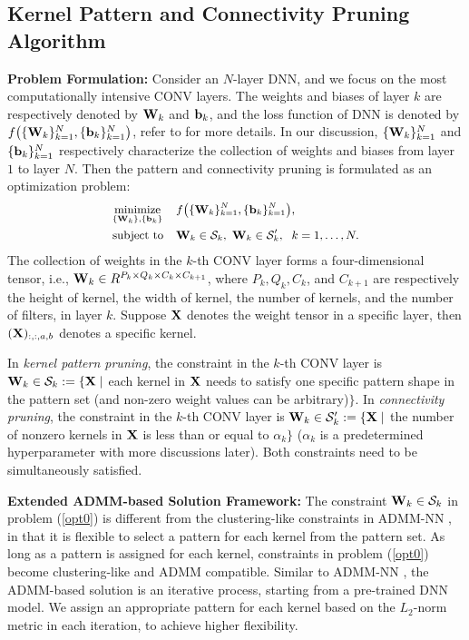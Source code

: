 \documentclass[sigplan,screen]{acmart}
\begin{document}
\subsection{Kernel Pattern and Connectivity Pruning Algorithm}

\textbf{Problem Formulation:} Consider an $N$-layer DNN, and we focus on the most computationally intensive CONV layers. The weights and biases of layer $k$ are respectively denoted by ${\bf{W}}_{k}$ and ${\bf{b}}_{k}$, and the loss function of DNN is denoted by $f \big( \{{\bf{W}}_{k}\}_{k=1}^N, \{{\bf{b}}_{k} \}_{k=1}^N \big)$, refer to \cite{zhang2018systematic}
for more details. In our 
discussion, $\{{\bf{W}}_{k}\}_{k=1}^N$ and $\{{\bf{b}}_{k} \}_{k=1}^N$ respectively characterize the collection of weights and biases from layer $1$ to layer $N$. Then the pattern and connectivity pruning is formulated as an optimization problem:
\begin{equation}
\label{opt0}\small
\begin{aligned}
& \underset{ \{{\bf{W}}_{k}\},\{{\bf{b}}_{k} \}}{\text{minimize}}
& & f \big( \{{\bf{W}}_{k}\}_{k=1}^N, \{{\bf{b}}_{k} \}_{k=1}^N \big),
\\ & \text{subject to}
& & {\bf{W}}_{k}\in {\mathcal{S}}_{k},\ {\bf{W}}_{k}\in {\mathcal{S}}'_{k},\ \; k = 1, \ldots, N.
\end{aligned}
\end{equation}
The collection of weights in the $k$-th CONV layer forms a four-dimensional tensor, i.e., ${\bf{W}}_{k} \in R^{P_k \times Q_k \times C_k \times C_{k+1}}$, where $P_k, Q_k, C_k$, and $C_{k+1}$ are respectively the height of kernel, the width of kernel, the number of kernels, and the number of filters, in layer $k$. Suppose $\bf{X}$ denotes the weight tensor in a specific layer, then $({\bf{X}})_{:,:,a,b}$ denotes a specific kernel. 

In \emph{kernel pattern pruning}, the constraint in the $k$-th CONV layer is ${\bf{W}}_{k}\in {\mathcal{S}}_{k}
:=
\{{\bf{X}}\mid$ {each kernel in} ${\bf{X}}$ {needs to satisfy one specific pattern shape in the pattern set (and non-zero weight values can be arbitrary)}$\}$.
In \emph{connectivity pruning}, the constraint in the $k$-th CONV layer is ${\bf{W}}_{k}\in {\mathcal{S}}'_{k}
:=
\{{\bf{X}}\mid$ {the number of nonzero kernels in} ${\bf{X}}$ {is less than or equal to} $\alpha_k \}$ ($\alpha_k$ is a predetermined hyperparameter with more discussions later).
Both constraints need to be simultaneously satisfied.

\textbf{Extended ADMM-based Solution Framework:} The constraint ${\bf{W}}_{k}\in {\mathcal{S}}_{k}$ in problem (\ref{opt0}) is different from the clustering-like constraints in ADMM-NN \cite{ren2019ADMMNN}, in that it is flexible to select a pattern for each kernel from the pattern set. As long as a pattern is assigned for each kernel, constraints in problem (\ref{opt0}) become clustering-like and ADMM compatible.
Similar to ADMM-NN \cite{ren2019ADMMNN}, the ADMM-based solution is an iterative process, starting from a pre-trained DNN model. We assign an appropriate pattern for each kernel based on the $L_2$-norm metric in each iteration, to achieve higher flexibility.
\end{document}
